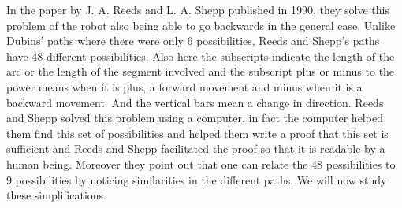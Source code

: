 \documentclass[11pt,a4paper]{article}
\begin{document}
		\begin{minipage}{0.8\textwidth}
	\raggedright
	In the paper by J. A. Reeds and L. A. Shepp published in 1990, they solve this problem of the robot also being able to go backwards in the general case. Unlike Dubins' paths where there were only 6 possibilities, Reeds and Shepp's paths have 48 different possibilities. Also here the subscripts indicate the length of the arc or the length of the segment involved and the subscript plus or minus to the power means when it is plus, a forward movement and minus when it is a backward movement. And the vertical bars mean a change in direction. Reeds and Shepp solved this problem using a computer, in fact the computer helped them find this set of possibilities and helped them write a proof that this set is sufficient and Reeds and Shepp facilitated the proof so that it is readable by a human being. Moreover they point out that one can relate the 48 possibilities to 9 possibilities by noticing similarities in the different paths. We will now study these simplifications.
	\end{minipage}
\end{document}
